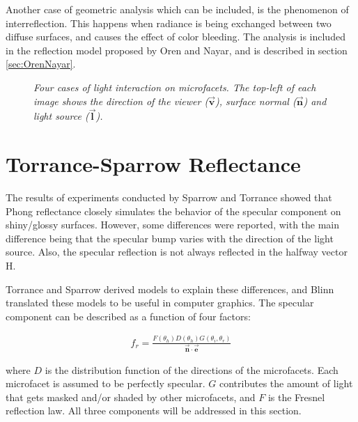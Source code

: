Another case of geometric analysis which can be included, is the phenomenon of interreflection. This happens when radiance is being exchanged between two diffuse surfaces, and causes the effect of color bleeding. The analysis is included in the reflection model proposed by Oren and Nayar, and is described in section \ref{sec:OrenNayar}.

\begin{figure}[H]
	\begin{center}
	\end{center}
	\caption{{\it Four cases of light interaction on microfacets. The top-left of each image shows the direction of the viewer ($\vec{\mathbf{v}}$), surface normal ($\vec{\mathbf{n}}$) and light source ($\vec{\mathbf{l}}$).}}
	\label{fig:GAF}
\end{figure}


\section{Torrance-Sparrow Reflectance}\label{sec:CookTorrance}
	The results of experiments conducted by Sparrow and Torrance \cite{TorranceSparrow} showed that Phong reflectance closely simulates the behavior of the specular component on shiny/glossy surfaces. However, some differences were reported, with the main difference being that the specular bump varies with the direction of the light source. Also, the specular reflection is not always reflected in the halfway vector H. 

Torrance and Sparrow derived models to explain these differences, and Blinn translated these models to be useful in computer graphics. The specular component can be described as a function of four factors: 
	
	\begin{eqnarray*}
		f_r = \frac{F(\theta_h)D(\theta_h)G(\theta_i,\theta_r)}{\vec{\mathbf{n}} \cdot \vec{\mathbf{e}}}
	\end{eqnarray*}

\noindent where $D$ is the distribution function of the directions of the microfacets. Each microfacet is assumed to be perfectly specular. $G$ contributes the amount of light that gets masked and/or shaded by other microfacets, and $F$ is the Fresnel reflection law. All three components will be addressed in this section.

